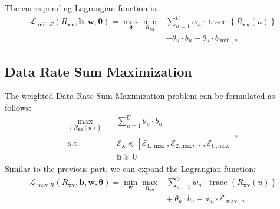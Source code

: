 The corresponding Lagrangian function is:
\begin{equation}
\begin{aligned}
\mathcal{L}_{\min E}\left(R_{\boldsymbol{x} \boldsymbol{x}}, \boldsymbol{b}, \boldsymbol{w}, \boldsymbol{\theta}\right)=\max _{\boldsymbol{\theta}} \min _{R_{\boldsymbol{x} \boldsymbol{x}}} &\sum_{u=1}^U  w_u \cdot \operatorname{trace}\left\{R_{\boldsymbol{x} \boldsymbol{x}}(u)\right\}\\ &+ \theta_u \cdot b_u-\theta_u \cdot b_{\min , u}
\end{aligned}
\end{equation}
\subsection{Data Rate Sum Maximization} \label{Rsum}
The weighted Data Rate Sum Maximization problem can be formulated as follows:
\begin{equation}
\begin{aligned}
\max _{\left\{R_{\boldsymbol{x} \boldsymbol{x}}{(u)}\right\}} \quad &\sum_{u=1}^U \theta_u \cdot b_u \\
\textrm{s.t.} \quad &\mathcal{E}_{\boldsymbol{x}} \preceq\left[\mathcal{E}_{1,\max}, \mathcal{E}_{2,\text{max}},\ldots,\mathcal{E}_{U,\text{max}}\right]^*\\
& \mathbf{b} \succeq 0
\end{aligned}
\end{equation}
Similar to the previous part, we can expand the Lagrangian function:
\begin{equation}
\begin{aligned}
\mathcal{L}_{\max R}\left(R_{\boldsymbol{x} \boldsymbol{x}}, \boldsymbol{b}, \boldsymbol{w}, \boldsymbol{\theta}\right)=\min _{\boldsymbol{w}} \max _{R_{\boldsymbol{x} \boldsymbol{x}}} &\sum_{u=1}^U w_u \cdot \operatorname{trace}\left\{R_{\boldsymbol{x} \boldsymbol{x}}(u)\right\}\\ &+\:\theta_u \cdot b_u-w_u \cdot \mathcal{E}_{\max , u}
\end{aligned}
\end{equation} 

